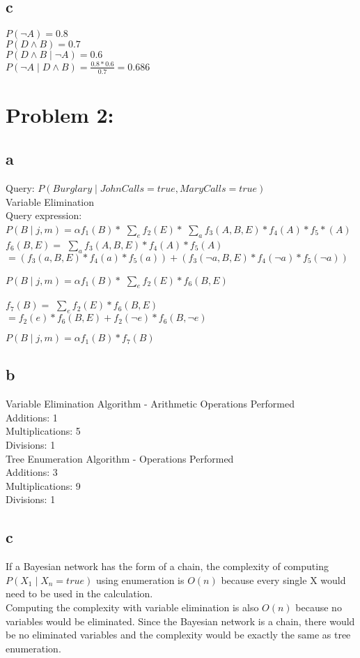 \documentclass[11pt, oneside]{article}   	%
\begin{document}
\begin{flushleft}
\subsection*{c}
$P(\neg A)=0.8$\\
$P(D \wedge B)=0.7$\\
$P(D \wedge B \mid \neg A)=0.6$\\
$P(\neg A \mid D \wedge B)=\frac{0.8*0.6}{0.7}=0.686$\\
\section*{Problem 2:}
\subsection*{a}
Query: $P(Burglary \mid JohnCalls = true, MaryCalls = true)$\\
Variable Elimination\\
Query expression:\\
$P(B \mid j,m) = \alpha f_1 (B) * $
$\sum_{e}
f_2 (E) * $
$\sum_{a}
f_3 (A, B, E) * f_4 (A) * f_5 * (A)$\\

$f_6 (B,E)=$
$\sum_{a}
f_3 (A,B,E)*f_4 (A)*f_5 (A)$\\
$=(f_3 (a, B, E)* f_4 (a)* f_5 (a)) + (f_3 (\neg a, B, E)* f_4 (\neg a)* f_5 (\neg a))$

$P(B \mid j,m)= \alpha f_1 (B)*$
$\sum_{e}
f_2 (E) * f_6 (B,E)$

$f_7 (B)=$
$\sum_{e}
f_2 (E) * f_6 (B,E)$\\
$=f_2 (e) *f_6 (B,E)+f_2 (\neg e) * f_6 (B, \neg e)$

$P(B \mid j,m)= \alpha f_1 (B) * f_7 (B)$

\subsection*{b}
Variable Elimination Algorithm - Arithmetic Operations Performed\\
Additions: 1\\
Multiplications: 5\\
Divisions: 1\\
Tree Enumeration Algorithm - Operations Performed\\
Additions: 3\\
Multiplications: 9\\
Divisions: 1\\
\subsection*{c}
If a Bayesian network has the form of a chain, the complexity of computing $P(X_1 \mid X_n = true)$ using enumeration is $O(n)$ because every single X would need to be used in the calculation.\\
Computing the complexity with variable elimination is also $O(n)$ because no variables would be eliminated. Since the Bayesian network is a chain, there would be no eliminated variables and the complexity would be exactly the same as tree enumeration.\\

\end{flushleft}
\end{document}
